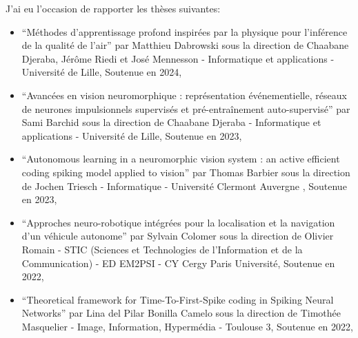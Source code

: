 \documentclass[10pt,french,a4paper,oneside]{article}%
\begin{document}
J'ai eu l'occasion de rapporter les thèses suivantes:
\begin{itemize}

    \item ``Méthodes d'apprentissage profond inspirées par la physique pour l'inférence de la qualité de l'air'' par Matthieu Dabrowski sous la direction de Chaabane Djeraba, Jérôme Riedi et José Mennesson - Informatique et applications - Université de Lille, Soutenue en 2024,

    \item ``Avancées en vision neuromorphique : représentation événementielle, réseaux de neurones impulsionnels supervisés et pré-entraînement auto-supervisé'' par Sami Barchid sous la direction de Chaabane Djeraba - Informatique et applications - Université de Lille, Soutenue en 2023,

    \item ``Autonomous learning in a neuromorphic vision system : an active efficient coding spiking model applied to vision'' par Thomas Barbier sous la direction de Jochen Triesch - Informatique - Université Clermont Auvergne , Soutenue en 2023,

    \item ``Approches neuro-robotique intégrées pour la localisation et la navigation d'un véhicule autonome'' par Sylvain Colomer sous la direction de Olivier Romain - STIC (Sciences et Technologies de l'Information et de la Communication) - ED EM2PSI - CY Cergy Paris Université, Soutenue en 2022,

    \item ``Theoretical framework for Time-To-First-Spike coding in Spiking Neural Networks'' par Lina del Pilar Bonilla Camelo sous la direction de Timothée Masquelier - Image, Information, Hypermédia - Toulouse 3, Soutenue en 2022,




\end{itemize}
\end{document}
